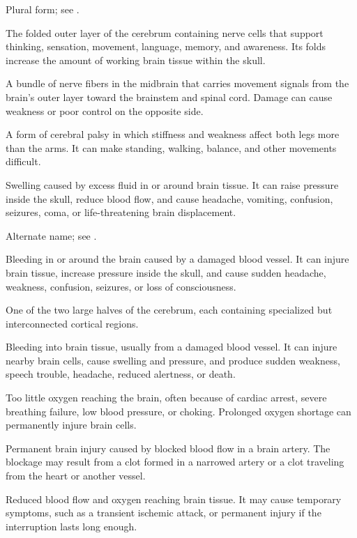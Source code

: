  Plural form; see .

 The folded outer layer of the cerebrum containing nerve cells that support thinking, sensation, movement, language, memory, and awareness. Its folds increase the amount of working brain tissue within the skull.

 A bundle of nerve fibers in the midbrain that carries movement signals from the brain’s outer layer toward the brainstem and spinal cord. Damage can cause weakness or poor control on the opposite side.

 A form of cerebral palsy in which stiffness and weakness affect both legs more than the arms. It can make standing, walking, balance, and other movements difficult.

 Swelling caused by excess fluid in or around brain tissue. It can raise pressure inside the skull, reduce blood flow, and cause headache, vomiting, confusion, seizures, coma, or life-threatening brain displacement.

 Alternate name; see .

 Bleeding in or around the brain caused by a damaged blood vessel. It can injure brain tissue, increase pressure inside the skull, and cause sudden headache, weakness, confusion, seizures, or loss of consciousness.

 One of the two large halves of the cerebrum, each containing specialized but interconnected cortical regions.

 Bleeding into brain tissue, usually from a damaged blood vessel. It can injure nearby brain cells, cause swelling and pressure, and produce sudden weakness, speech trouble, headache, reduced alertness, or death.

 Too little oxygen reaching the brain, often because of cardiac arrest, severe breathing failure, low blood pressure, or choking. Prolonged oxygen shortage can permanently injure brain cells.

 Permanent brain injury caused by blocked blood flow in a brain artery. The blockage may result from a clot formed in a narrowed artery or a clot traveling from the heart or another vessel.

 Reduced blood flow and oxygen reaching brain tissue. It may cause temporary symptoms, such as a transient ischemic attack, or permanent injury if the interruption lasts long enough.


